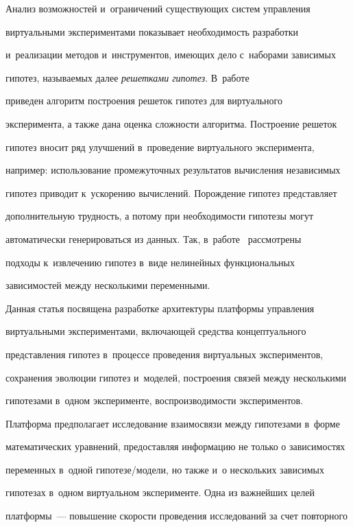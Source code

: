 Анализ возможностей и~ограничений существующих систем управления 


виртуальными экспериментами показывает необходимость разработки 


и~реализации методов и~инструментов, имеющих дело с~наборами зависимых 


гипотез, называемых далее \textit{решетками гипотез}. В~работе~\cite{4-kt} 


приведен алгоритм построения решеток гипотез для виртуального 


эксперимента, а также дана оценка сложности алгоритма. Построение решеток 


гипотез вносит ряд улучшений в~проведение виртуального эксперимента, 


например: использование промежуточных результатов вычисления независимых 


гипотез приводит к~ускорению вычислений. Порождение гипотез представляет 


дополнительную трудность, а потому при не\-об\-хо\-ди\-мости гипотезы могут 


автоматически генерироваться из данных. Так, в~работе~\cite{5-kt} рассмотрены 


подходы к~извлечению гипотез в~виде нелинейных функциональных 


зависимостей между несколькими переменными.





Данная статья посвящена разработке архитектуры платформы управления 


виртуальными экспериментами, включающей средства концептуального 


пред\-став\-ле\-ния гипотез в~процессе проведения виртуальных экспериментов, 


сохранения эволюции гипотез и~моделей, построения связей между несколькими 


гипотезами в~одном эксперименте, воспроизводимости экспериментов. 


Платформа предполагает исследование взаимосвязи между гипотезами в~форме 


математических уравнений, предоставляя информацию не только о зависимостях 


переменных в~одной гипотезе\!/\!модели, но также и~о нескольких зависимых 


гипотезах в~одном виртуальном эксперименте. Одна из важнейших целей 


платформы~--- повышение скорости проведения исследований за счет повторного 


